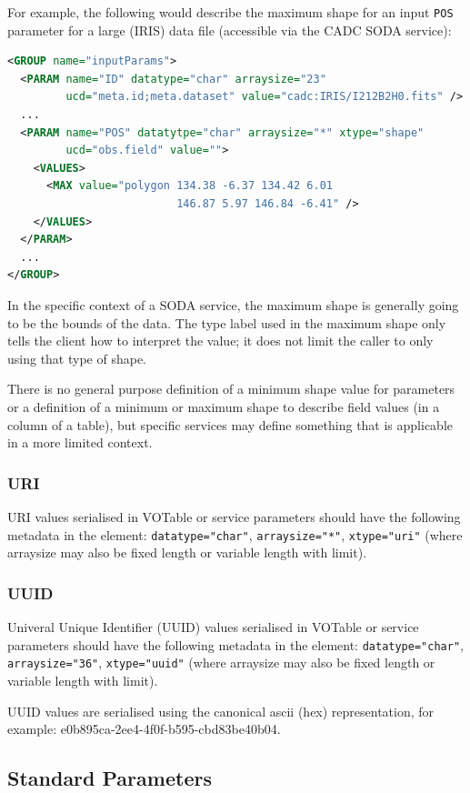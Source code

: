\documentclass[11pt,letter]{ivoa}
\begin{document}
For example, the following would describe the maximum shape for an input \verb|POS| 
parameter for a large (IRIS) data file (accessible via the CADC SODA service):
\begin{lstlisting}[language=XML]
<GROUP name="inputParams">
  <PARAM name="ID" datatype="char" arraysize="23" 
         ucd="meta.id;meta.dataset" value="cadc:IRIS/I212B2H0.fits" />
  ...
  <PARAM name="POS" datatytpe="char" arraysize="*" xtype="shape" 
         ucd="obs.field" value="">
    <VALUES>
      <MAX value="polygon 134.38 -6.37 134.42 6.01 
                          146.87 5.97 146.84 -6.41" />
    </VALUES>
  </PARAM>
  ...
</GROUP>
\end{lstlisting}
In the specific context of a SODA service, the maximum shape is generally going 
to be the bounds of the data. The type label used in the maximum shape only tells 
the client how to interpret the value; it does not limit the caller to only using 
that type of shape.

There is no general purpose definition of a minimum shape value for parameters or
a definition of a minimum or maximum shape to describe field values (in a column
of a table), but specific services may define something that is applicable in a
more limited context.

\subsubsection{URI}
URI values \citep{std:RFC3986} serialised in VOTable or service parameters 
should have the following metadata in the  element: \verb|datatype="char"|, 
\verb|arraysize="*"|, \verb|xtype="uri"| (where arraysize may also be fixed length or 
variable length with limit).

\subsubsection{UUID}
Univeral Unique Identifier (UUID) values serialised in VOTable or service parameters 
should have the following metadata in the  element: \verb|datatype="char"|, 
\verb|arraysize="36"|, \verb|xtype="uuid"| (where arraysize may also be fixed length or 
variable length with limit).

UUID values \citep{std:RFC4122} are serialised using the canonical ascii (hex) 
representation, for example: e0b895ca-2ee4-4f0f-b595-cbd83be40b04.

\subsection{Standard Parameters}
\end{document}
